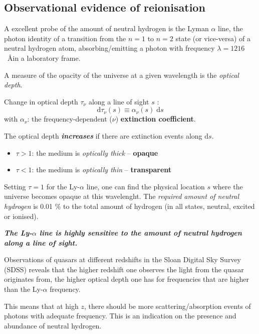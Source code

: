\documentclass[ignorenonframetext]{beamer}
\newcommand{\diff}{\ensuremath{\; \text{d}}}
\newcommand{\diffd}{\ensuremath{\text{d}}}
\begin{document}
\subsection{Observational evidence of reionisation}
A excellent probe of the amount of neutral hydrogen is the Lyman $\alpha$ line, the photon identity of a transition from the $n=1$ to $n=2$ state (or vice-versa) of a neutral hydrogen atom, absorbing/emitting a photon with frequency $\lambda = 1216$~\AA in a laboratory frame.

A measure of the opacity of the universe at a given wavelength is the \textit{optical depth}. 

\begin{frame}
    Change in optical depth $\tau_\nu$ along a line of sight $s$ :
    \begin{equation}
        \diffd \tau_\nu(s) \equiv \alpha_{\nu}(s) \diff s
        \label{eq:dtau}
    \end{equation}
    with $\alpha_\nu$: the frequency-dependent ($\nu$) \textbf{extinction coefficient}.

    The optical depth \textbf{\textit{increases}} if there are extinction events along $\diffd s$.

    \begin{itemize}
        \item $\tau > 1$: the medium is \textit{optically thick} -- \textbf{opaque}
        \item $\tau < 1$: the medium is \textit{optically thin} -- \textbf{transparent}
    \end{itemize}

\end{frame}

Setting $\tau = 1$ for the Ly-$\alpha$ line, one can find the physical location $s$ where the universe becomes opaque at this wavelenght. The \textit{required amount of neutral hydrogen} is 0.01 \% to the total amount of hydrogen (in all states, neutral, excited or ionised).

{\center
    \textit{\textbf{The Ly-$\alpha$ line is highly sensitive to the amount of neutral hydrogen along a line of sight.}}
}

Observations of quasars at different redshifts in the Sloan Digital Sky Survey (SDSS) reveals that the higher redshift one observes the light from the quasar originates from, the higher optical depth one has for frequencies that are higher than the Ly-$\alpha$ frequency. 

This means that at high $z$, there should be more scattering/absorption events of photons with adequate frequency. This is an indication on the presence and abundance of neutral hydrogen. 
\end{document}
